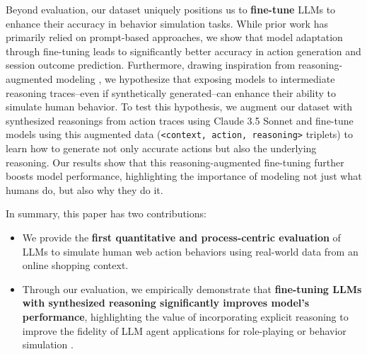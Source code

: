 \documentclass[11pt]{article}
\begin{document}
Beyond evaluation, our dataset uniquely positions us to\textbf{ fine-tune} LLMs to enhance their accuracy in behavior simulation tasks. 
While prior work has primarily relied on prompt-based approaches, we show that model adaptation through fine-tuning leads to significantly better accuracy in action generation and session outcome prediction.
Furthermore, drawing inspiration from reasoning-augmented modeling \cite{deepseek-aiDeepSeekR1IncentivizingReasoning2025}, we hypothesize that exposing models to intermediate reasoning traces--even if synthetically generated--can enhance their ability to simulate human behavior.
To test this hypothesis, we augment our dataset with synthesized reasonings from action traces using Claude 3.5 Sonnet and fine-tune models using this augmented data (\texttt{<context, action, reasoning>} triplets) to learn how to generate not only accurate actions but also the underlying reasoning.
Our results show that this reasoning-augmented fine-tuning further boosts model performance, highlighting the importance of modeling not just what humans do, but also why they do it.

In summary, this paper has two contributions:

\begin{itemize}
    \item We provide the \textbf{first quantitative and process-centric evaluation} of LLMs to simulate human web action behaviors using real-world data from an online shopping context.
    
    \item Through our evaluation, we empirically demonstrate that \textbf{fine-tuning LLMs with synthesized reasoning significantly improves model's performance}, highlighting the value of incorporating explicit reasoning to improve the fidelity of LLM agent applications for role-playing or behavior simulation .
\end{itemize}
\end{document}
